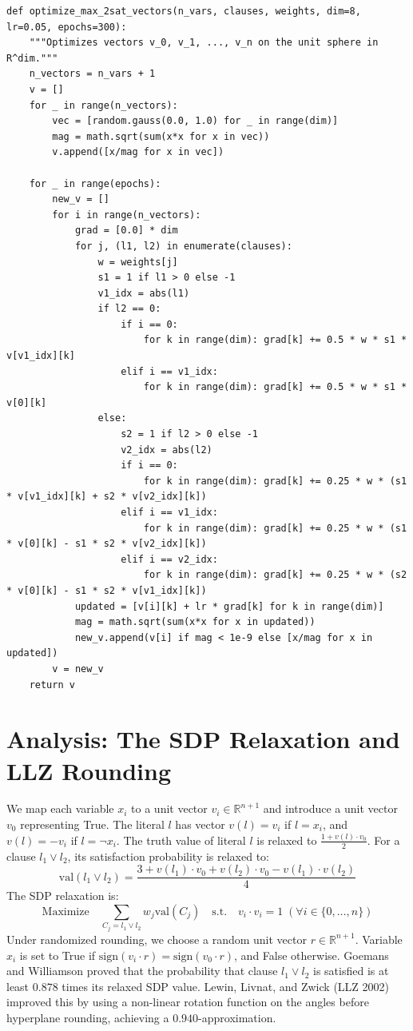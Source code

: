 \documentclass[11pt,oneside]{book}
\begin{document}
\begin{lstlisting}[style=python, caption=SDP Max 2-SAT Algorithm]
def optimize_max_2sat_vectors(n_vars, clauses, weights, dim=8, lr=0.05, epochs=300):
    """Optimizes vectors v_0, v_1, ..., v_n on the unit sphere in R^dim."""
    n_vectors = n_vars + 1
    v = []
    for _ in range(n_vectors):
        vec = [random.gauss(0.0, 1.0) for _ in range(dim)]
        mag = math.sqrt(sum(x*x for x in vec))
        v.append([x/mag for x in vec])
        
    for _ in range(epochs):
        new_v = []
        for i in range(n_vectors):
            grad = [0.0] * dim
            for j, (l1, l2) in enumerate(clauses):
                w = weights[j]
                s1 = 1 if l1 > 0 else -1
                v1_idx = abs(l1)
                if l2 == 0:
                    if i == 0:
                        for k in range(dim): grad[k] += 0.5 * w * s1 * v[v1_idx][k]
                    elif i == v1_idx:
                        for k in range(dim): grad[k] += 0.5 * w * s1 * v[0][k]
                else:
                    s2 = 1 if l2 > 0 else -1
                    v2_idx = abs(l2)
                    if i == 0:
                        for k in range(dim): grad[k] += 0.25 * w * (s1 * v[v1_idx][k] + s2 * v[v2_idx][k])
                    elif i == v1_idx:
                        for k in range(dim): grad[k] += 0.25 * w * (s1 * v[0][k] - s1 * s2 * v[v2_idx][k])
                    elif i == v2_idx:
                        for k in range(dim): grad[k] += 0.25 * w * (s2 * v[0][k] - s1 * s2 * v[v1_idx][k])
            updated = [v[i][k] + lr * grad[k] for k in range(dim)]
            mag = math.sqrt(sum(x*x for x in updated))
            new_v.append(v[i] if mag < 1e-9 else [x/mag for x in updated])
        v = new_v
    return v
\end{lstlisting}

\section{Analysis: The SDP Relaxation and LLZ Rounding}
We map each variable $x_i$ to a unit vector $v_i \in \mathbb{R}^{n+1}$ and introduce a unit vector $v_0$ representing True. The literal $l$ has vector $v(l) = v_i$ if $l = x_i$, and $v(l) = -v_i$ if $l = \neg x_i$.
The truth value of literal $l$ is relaxed to $\frac{1 + v(l) \cdot v_0}{2}$.
For a clause $l_1 \lor l_2$, its satisfaction probability is relaxed to:
\[
\text{val}(l_1 \lor l_2) = \frac{3 + v(l_1) \cdot v_0 + v(l_2) \cdot v_0 - v(l_1) \cdot v(l_2)}{4}
\]
The SDP relaxation is:
\[
\text{Maximize} \quad \sum_{C_j = l_1 \lor l_2} w_j \text{val}(C_j) \quad \text{s.t.} \quad v_i \cdot v_i = 1 \; (\forall i \in \{0, \dots, n\})
\]
Under randomized rounding, we choose a random unit vector $r \in \mathbb{R}^{n+1}$. Variable $x_i$ is set to True if $\text{sign}(v_i \cdot r) = \text{sign}(v_0 \cdot r)$, and False otherwise.
Goemans and Williamson proved that the probability that clause $l_1 \lor l_2$ is satisfied is at least $0.878$ times its relaxed SDP value.
Lewin, Livnat, and Zwick (LLZ 2002) improved this by using a non-linear rotation function on the angles before hyperplane rounding, achieving a $0.940$-approximation.
\end{document}
